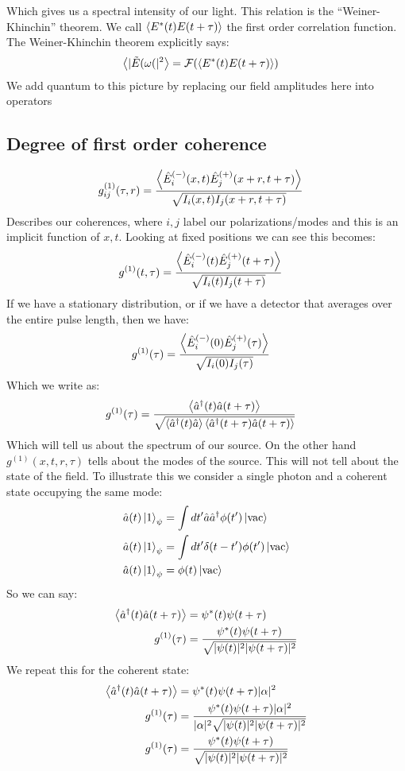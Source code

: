 Which gives us a spectral intensity of our light. This relation is the ``Weiner-Khinchin'' theorem. We call $\expval{E^*(t)E(t+\tau)}$ the first order correlation function. The Weiner-Khinchin theorem explicitly says:
\begin{align*}
	\expval{|\tilde{E}(\omega(|^2} &= \mathcal{F}(\expval{E^*(t)E(t+\tau)})
\end{align*}
We add quantum to this picture by replacing our field amplitudes here into operators
\subsection{Degree of first order coherence}
\begin{align*}
	g_{ij}^{(1)} (\tau,r) &= \frac{\expval{\hat{E}_i^{(-)}(x,t)\hat{E}_j^{(+)}(x+ r,t+\tau)}}{\sqrt{I_i(x,t) I_j(x+r,t+\tau)}}
\end{align*}
Describes our coherences, where $i,j$ label our polarizations/modes and this is an implicit function of $x,t$. Looking at fixed positions we can see this becomes:
\begin{align*}
	g^{(1)}(t,\tau) &= \frac{\expval{\hat{E}_i^{(-)}(t)\hat{E}_j^{(+)}(t+\tau)}}{\sqrt{I_i(t) I_j(t+\tau)}}
\end{align*}
If we have a stationary distribution, or if we have a detector that averages over the entire pulse length, then we have:
\begin{align*}
	g^{(1)}(\tau) &= \frac{\expval{\hat{E}_i^{(-)}(0)\hat{E}_j^{(+)}(\tau)}}{\sqrt{I_i(0) I_j(\tau)}}
\end{align*}
Which we write as:
\begin{align*}
	g^{(1)}(\tau) &= \frac{\expval{\hat{a}^\dagger(t)\hat{a}(t+\tau)}}{\sqrt{\expval{\hat{a}^\dagger(t)\hat{a}}\expval{\hat{a}^\dagger(t+\tau)\hat{a}(t+\tau)}}}
\end{align*}
Which will tell us about the spectrum of our source. On the other hand $g^{(1)}(x,t,r,\tau)$ tells about the modes of the source. This will not tell about the state of the field. To illustrate this we consider a single photon and a coherent state occupying the same mode:
\begin{align*}
	\hat{a}(t)\ket{1}_\psi &= \int dt' \hat{a}\hat{a}^\dagger \phi(t') \ket{\text{vac}} \\
	\hat{a}(t)\ket{1}_\psi &= \int dt' \delta(t-t') \phi(t') \ket{\text{vac}} \\
	\hat{a}(t)\ket{1}_\psi &= \phi(t) \ket{\text{vac}}
\end{align*}
So we can say:
\begin{align*}
	\expval{\hat{a}^\dagger(t) \hat{a}(t+\tau)} &= \psi^*(t)\psi(t+\tau) \\
	g^{(1)}(\tau) &= \frac{\psi^*(t)\psi(t+\tau)}{\sqrt{|\psi(t)|^2|\psi(t+\tau)|^2}}
\end{align*}
We repeat this for the coherent state:
\begin{align*}
	\expval{\hat{a}^\dagger(t)\hat{a}(t+\tau)} &= \psi^*(t)\psi(t+\tau)|\alpha|^2 \\
	g^{(1)}(\tau) &= \frac{\psi^*(t)\psi(t+\tau)|\alpha|^2}{|\alpha|^2\sqrt{|\psi(t)|^2|\psi(t+\tau)|^2}}\\
	g^{(1)}(\tau) &= \frac{\psi^*(t)\psi(t+\tau)}{\sqrt{|\psi(t)|^2|\psi(t+\tau)|^2}}
\end{align*}
